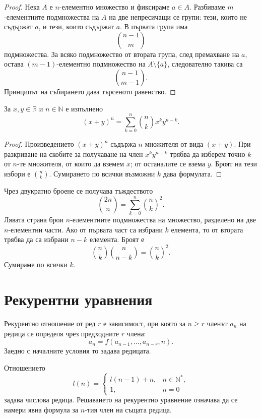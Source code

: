 \begin{proof}
Нека $A$ е $n$-елементно множество и фиксираме $a\in A$. Разбиваме $m$-елементните подмножества на $A$ на две непресичащи се групи: тези, които не съдържат $a$, и тези, които съдържат $a$. В първата група има
\[
\binom{n-1}{m}
\]
подмножества. За всяко подмножество от втората група, след премахване на $a$, остава $(m-1)$-елементно подмножество на $A\setminus\{a\}$, следователно такива са
\[
\binom{n-1}{m-1}.
\]
Принципът на събирането дава търсеното равенство.
\end{proof}

\begin{keythm}
За $x,y\in\mathbb{R}$ и $n\in\mathbb{N}$ е изпълнено
\[
(x+y)^n
=
\sum_{k=0}^{n}\binom{n}{k}x^k y^{n-k}.
\]
\end{keythm}

\begin{proof}
Произведението $(x+y)^n$ съдържа $n$ множителя от вида $(x+y)$. При разкриване на скобите за получаване на член $x^k y^{n-k}$ трябва да изберем точно $k$ от $n$-те множителя, от които да вземем $x$; от останалите се взема $y$. Броят на тези избори е $\binom{n}{k}$. Сумирането по всички възможни $k$ дава формулата.
\end{proof}

\begin{example}
Чрез двукратно броене се получава тъждеството
\[
\binom{2n}{n}
=
\sum_{k=0}^{n}\binom{n}{k}^2.
\]
Лявата страна брои $n$-елементните подмножества на множество, разделено на две $n$-елементни части. Ако от първата част са избрани $k$ елемента, то от втората трябва да са избрани $n-k$ елемента. Броят е
\[
\binom{n}{k}\binom{n}{n-k}
=
\binom{n}{k}^2.
\]
Сумираме по всички $k$.
\end{example}

\section{Рекурентни уравнения}\label{s:2.4}

\begin{defn}
Рекурентно отношение от ред $r$ е зависимост, при която за $n\geq r$ членът $a_n$ на редица се определя чрез предходните $r$ члена:
\[
a_n=f(a_{n-1},\ldots,a_{n-r},n).
\]
Заедно с началните условия то задава редицата.
\end{defn}

\begin{example}
Отношението
\[
l(n)=
\begin{cases}
l(n-1)+n,& n\in\mathbb{N}^{*},\\
1,& n=0
\end{cases}
\]
задава числова редица. Решаването на рекурентно уравнение означава да се намери явна формула за $n$-тия член на същата редица.
\end{example}

